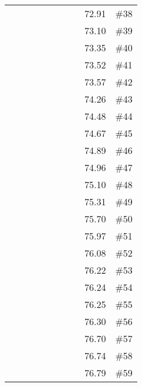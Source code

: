 \begin{longtable}{|c|c|c|c|c|c|c|c|c|c|}
 \x    & \x    & \x    & \x    & \x    & \x\m  &       & \x\m  & 72.91 & \#38 \\
 \x    & \x    &       &       & \x\m  & \x\m  & \x\m  &       & 73.10 & \#39 \\
 \x    & \x    & \x    & \x    & \x\m  &       &       &       & 73.35 & \#40 \\
 \x    & \x    & \x    &       & \x    &       &       & \x    & 73.52 & \#41 \\
 \x    & \x    & \x    &       & \x    & \x\m  &       & \x\m  & 73.57 & \#42 \\
 \x    & \x    & \x    &       &       & \x    &       & \x\m  & 74.26 & \#43 \\
 \x    & \x    &       &       & \x\m  & \x\m  &       &       & 74.48 & \#44 \\
 \x    & \x    & \x    &       & \x    &       &       & \x\m  & 74.67 & \#45 \\
 \x    & \x    & \x    & \x    & \x\m  & \x    &       &       & 74.89 & \#46 \\
 \x    & \x    & \x    &       & \x    &       & \x    &       & 74.96 & \#47 \\
 \x    & \x    & \x    & \x    & \x    & \x    & \x    &       & 75.10 & \#48 \\
 \x    & \x    &       & \x    & \x    &       &       & \x    & 75.31 & \#49 \\
 \x    & \x    & \x    & \x    & \x    & \x    & \x\m  &       & 75.70 & \#50 \\
 \x    & \x    & \x    & \x    & \x    &       &       & \x\m  & 75.97 & \#51 \\
 \x    & \x    &       & \x    & \x\m  &       & \x\m  &       & 76.08 & \#52 \\
 \x    & \x    &       & \x    & \x\m  & \x\m  & \x\m  &       & 76.22 & \#53 \\
 \x    & \x    & \x    &       & \x    & \x\m  & \x    &       & 76.24 & \#54 \\
 \x    & \x    & \x    &       & \x\m  &       &       & \x\m  & 76.25 & \#55 \\
 \x    & \x    &       &       & \x\m  &       &       & \x\m  & 76.30 & \#56 \\
 \x    & \x    &       &       & \x\m  & \x\m  &       & \x\m  & 76.70 & \#57 \\
 \x    & \x    & \x    & \x    &       &       &       &       & 76.74 & \#58 \\
 \x    & \x    &       &       & \x\m  &       &       &       & 76.79 & \#59 \\

\end{longtable}
